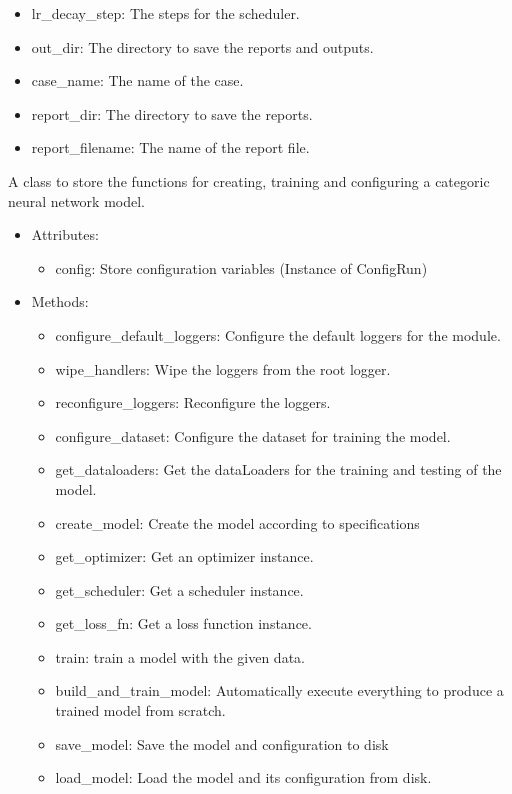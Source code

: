 \documentclass[a4paper, 11pt]{report}
\begin{document}
\begin{tcolorbox}[title=ConfigRun - From the Docs]
\begin{itemize}
\begin{itemize}
            \item lr\_decay\_step: The steps for the scheduler.
            \item out\_dir: The directory to save the reports and outputs.
            \item case\_name: The name of the case.
            \item report\_dir: The directory to save the reports.
            \item report\_filename: The name of the report file.
        \end{itemize}
    \end{itemize}
    \end{tcolorbox}

    \begin{tcolorbox}[title=ModelApi - From the Docs]
    A class to store the functions for creating, training and configuring a categoric neural network model.

    \begin{itemize}
        \item Attributes:
        \begin{itemize}
            \item config: Store configuration variables (Instance of ConfigRun)
        \end{itemize}
        \item Methods:
        \begin{itemize}
            \item configure\_default\_loggers: Configure the default loggers for the module.
            \item wipe\_handlers: Wipe the loggers from the root logger.
            \item reconfigure\_loggers: Reconfigure the loggers.
            \item configure\_dataset: Configure the dataset for training the model.
            \item get\_dataloaders: Get the dataLoaders for the training and testing of the model.
            \item create\_model: Create the model according to specifications
            \item get\_optimizer: Get an optimizer instance.
            \item get\_scheduler: Get a scheduler instance.
            \item get\_loss\_fn: Get a loss function instance.
            \item train: train a model with the given data.
            \item build\_and\_train\_model: Automatically execute everything to produce a trained model from scratch.
            \item save\_model: Save the model and configuration to disk
            \item load\_model: Load the model and its configuration from disk.

        \end{itemize}
    \end{itemize}
    \end{tcolorbox}
\end{document}
